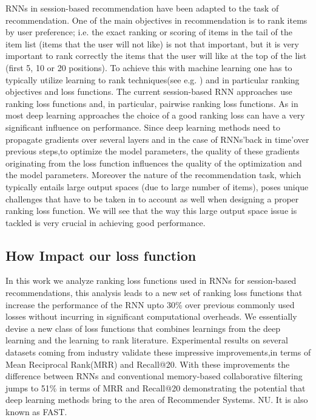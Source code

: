 RNNs in session-based recommendation have been adapted to the task of recommendation. One of the main objectives in recommendation is to rank items by user preference; i.e. the exact ranking or scoring of items in the tail of the item list (items that the user will not like) is not that important, but it is very important to rank correctly the items that the user will like at the top of the list (ﬁrst 5, 10 or 20 positions). To achieve this with machine learning one has to typically utilize learning to rank techniques(see e.g. \cite{burges2010ranknet}) and in particular ranking objectives and loss functions. The current session-based RNN approaches use ranking loss functions and, in particular, pairwise ranking loss functions. As in most deep learning approaches the choice of a good ranking loss can have a very signiﬁcant inﬂuence on performance. Since deep learning methods need to propagate gradients over several layers and in the case of RNNs’back in time’over previous steps,to optimize the model parameters, the quality of these gradients originating from the loss function inﬂuences the quality of the optimization and the model parameters. Moreover the nature of the recommendation task, which typically entails large output spaces (due to large number of items), poses unique challenges that have to be taken in to account as well when designing a proper ranking loss function. We will see that the way this large output space issue is tackled is very crucial in achieving good performance.







\label{sec:abc}
\subsection{How Impact our loss function}

In this work we analyze ranking loss functions used in RNNs for session-based recommendations, this analysis leads to a new set of ranking loss functions that increase the performance of the RNN upto 30\% over previous commonly used losses without incurring in signiﬁcant computational overheads. We essentially devise a new class of loss functions that combines learnings from the deep learning and the learning to rank literature. Experimental results on several datasets coming from industry validate these impressive improvements,in terms of Mean Reciprocal Rank(MRR) and Recall@20. With these improvements the difference between RNNs and conventional memory-based collaborative ﬁltering jumps to 51\% in terms of MRR and Recall@20 demonstrating the potential that deep learning methods bring to the area of Recommender Systems. NU.  It is also known as FAST. 

